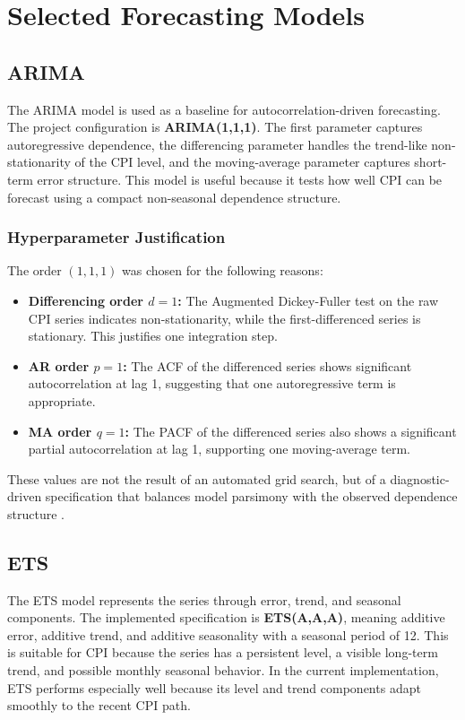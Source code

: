 \section{Selected Forecasting Models}

\subsection{ARIMA}

The ARIMA model is used as a baseline for autocorrelation-driven forecasting. The project configuration is \textbf{ARIMA(1,1,1)}. The first parameter captures autoregressive dependence, the differencing parameter handles the trend-like non-stationarity of the CPI level, and the moving-average parameter captures short-term error structure. This model is useful because it tests how well CPI can be forecast using a compact non-seasonal dependence structure.

\subsubsection{Hyperparameter Justification}

The order $(1,1,1)$ was chosen for the following reasons:

\begin{itemize}
	\item \textbf{Differencing order $d=1$:} The Augmented Dickey-Fuller test on the raw CPI series indicates non-stationarity, while the first-differenced series is stationary. This justifies one integration step.
	\item \textbf{AR order $p=1$:} The ACF of the differenced series shows significant autocorrelation at lag 1, suggesting that one autoregressive term is appropriate.
	\item \textbf{MA order $q=1$:} The PACF of the differenced series also shows a significant partial autocorrelation at lag 1, supporting one moving-average term.
\end{itemize}

These values are not the result of an automated grid search, but of a diagnostic-driven specification that balances model parsimony with the observed dependence structure \cite{Box2015,Hyndman2021}.

\subsection{ETS}

The ETS model represents the series through error, trend, and seasonal components. The implemented specification is \textbf{ETS(A,A,A)}, meaning additive error, additive trend, and additive seasonality with a seasonal period of 12. This is suitable for CPI because the series has a persistent level, a visible long-term trend, and possible monthly seasonal behavior. In the current implementation, ETS performs especially well because its level and trend components adapt smoothly to the recent CPI path.

